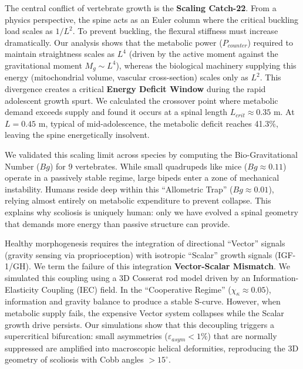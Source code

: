 \documentclass[11pt]{article}
\begin{document}
The central conflict of vertebrate growth is the \textbf{Scaling Catch-22}. From a physics perspective, the spine acts as an Euler column where the critical buckling load scales as $1/L^2$. To prevent buckling, the flexural stiffness must increase dramatically. Our analysis shows that the metabolic power ($P_{counter}$) required to maintain straightness scales as $L^4$ (driven by the active moment against the gravitational moment $M_g \sim L^4$), whereas the biological machinery supplying this energy (mitochondrial volume, vascular cross-section) scales only as $L^2$\cite{west1997,rolfe1997}. This divergence creates a critical \textbf{Energy Deficit Window} during the rapid adolescent growth spurt. We calculated the crossover point where metabolic demand exceeds supply and found it occurs at a spinal length $L_{crit} \approx 0.35$ m. At $L=0.45$ m, typical of mid-adolescence, the metabolic deficit reaches 41.3\%, leaving the spine energetically insolvent.

We validated this scaling limit across species by computing the Bio-Gravitational Number ($Bg$) for 9 vertebrates. While small quadrupeds like mice ($Bg \approx 0.11$) operate in a passively stable regime, large bipeds enter a zone of mechanical instability. Humans reside deep within this ``Allometric Trap'' ($Bg \approx 0.01$), relying almost entirely on metabolic expenditure to prevent collapse. This explains why scoliosis is uniquely human: only we have evolved a spinal geometry that demands more energy than passive structure can provide.

Healthy morphogenesis requires the integration of directional ``Vector'' signals (gravity sensing via proprioception) with isotropic ``Scalar'' growth signals (IGF-1/GH). We term the failure of this integration \textbf{Vector-Scalar Mismatch}. We simulated this coupling using a 3D Cosserat rod model driven by an Information-Elasticity Coupling (IEC) field. In the ``Cooperative Regime'' ($\chi_\kappa \approx 0.05$), information and gravity balance to produce a stable S-curve. However, when metabolic supply fails, the expensive Vector system collapses while the Scalar growth drive persists. Our simulations show that this decoupling triggers a supercritical bifurcation: small asymmetries ($\varepsilon_{asym} < 1\%$) that are normally suppressed are amplified into macroscopic helical deformities, reproducing the 3D geometry of scoliosis with Cobb angles $>15^\circ$.
\end{document}
